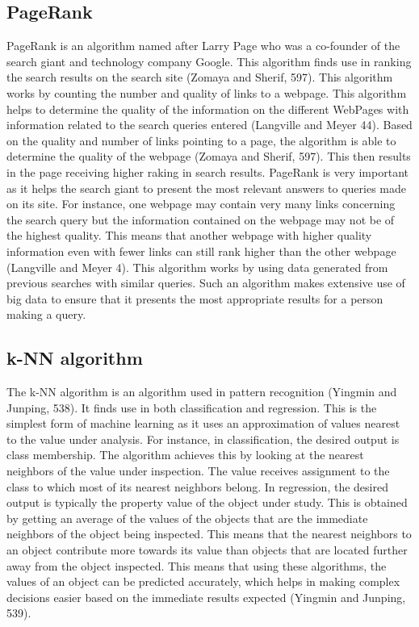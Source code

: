 \documentclass[sigconf]{acmart}
\begin{document}
\subsection{PageRank}
PageRank is an algorithm named after Larry Page who was a co-founder of the search giant and technology company Google. This algorithm finds use in ranking the search results on the search site (Zomaya and Sherif, 597). This algorithm works by counting the number and quality of links to a webpage. This algorithm helps to determine the quality of the information on the different WebPages with information related to the search queries entered (Langville and Meyer 44). Based on the quality and number of links pointing to a page, the algorithm is able to determine the quality of the webpage (Zomaya and Sherif, 597). This then results in the page receiving higher raking in search results. PageRank is very important as it helps the search giant to present the most relevant answers to queries made on its site. 
For instance, one webpage may contain very many links concerning the search query but the information contained on the webpage may not be of the highest quality. This means that another webpage with higher quality information even with fewer links can still rank higher than the other webpage (Langville and Meyer 4). This algorithm works by using data generated from previous searches with similar queries. Such an algorithm makes extensive use of big data to ensure that it presents the most appropriate results for a person making a query. 


\subsection{k-NN algorithm}
The k-NN algorithm is an algorithm used in pattern recognition (Yingmin and Junping, 538). It finds use in both classification and regression. This is the simplest form of machine learning as it uses an approximation of values nearest to the value under analysis. For instance, in classification, the desired output is class membership. The algorithm achieves this by looking at the nearest neighbors of the value under inspection. The value receives assignment to the class to which most of its nearest neighbors belong. In regression, the desired output is typically the property value of the object under study. This is obtained by getting an average of the values of the objects that are the immediate neighbors of the object being inspected. This means that the nearest neighbors to an object contribute more towards its value than objects that are located further away from the object inspected. This means that using these algorithms, the values of an object can be predicted accurately, which helps in making complex decisions easier based on the immediate results expected (Yingmin and Junping, 539).
\end{document}
